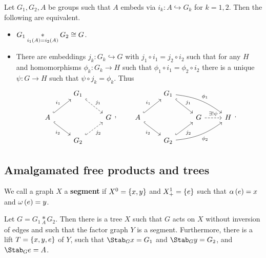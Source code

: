 \begin{fact}
Let $ G_1, G_2, A $ be groups such that $ A $ embeds via $ i_k : A \hookrightarrow G_k $ for $ k = 1, 2 $. Then the following are equivalent.
\begin{itemize}
\item $ G_1 \underset{i_1\br{A} = i_2\br{A}}{*} G_2 \cong G $.
\item There are embeddings $ j_k : G_k \hookrightarrow G $ with $ j_1 \circ i_1 = j_2 \circ i_2 $ such that for any $ H $ and homomorphisms $ \phi_k : G_k \to H $ such that $ \phi_1 \circ i_1 = \phi_2 \circ i_2 $ there is a unique $ \psi : G \to H $ such that $ \psi \circ j_k = \phi_k $. Thus
$$
\begin{tikzcd}
& G_1 \arrow[dashed, hookrightarrow]{dr}{j_1} & \\
A \arrow[hookrightarrow]{ur}{i_1} \arrow[hookrightarrow, swap]{dr}{i_2} & & G \\
& G_2 \arrow[dashed, hookrightarrow, swap]{ur}{j_2} &
\end{tikzcd},
\qquad
\begin{tikzcd}
& G_1 \arrow[hookrightarrow]{dr}{j_1} \arrow[bend left=15]{drr}{\phi_1} & & \\
A \arrow[hookrightarrow]{ur}{i_1} \arrow[hookrightarrow, swap]{dr}{i_2} & & G \arrow[dashed]{r}{\exists !\psi} & H \\
& G_2 \arrow[hookrightarrow, swap]{ur}{j_2} \arrow[bend right=15, swap]{urr}{\phi_2} & &
\end{tikzcd}.
$$
\end{itemize}
\end{fact}

\subsection{Amalgamated free products and trees}

\begin{definition}
We call a graph $ X $ a \textbf{segment} if $ X^0 = \cbr{x, y} $ and $ X_+^1 = \cbr{e} $ such that $ \alpha\br{e} = x $ and $ \omega\br{e} = y $.
\end{definition}

\begin{theorem}
\label{thm:2.3.2}
Let $ G = G_1 \underset{A}{*} G_2 $. Then there is a tree $ X $ such that $ G $ acts on $ X $ without inversion of edges and such that the factor graph $ Y $ is a segment. Furthermore, there is a lift $ T = \cbr{x, y, e} $ of $ Y $, such that $ \Stab_G x = G_1 $ and $ \Stab_G y = G_2 $, and $ \Stab_G e = A $.
\end{theorem}

